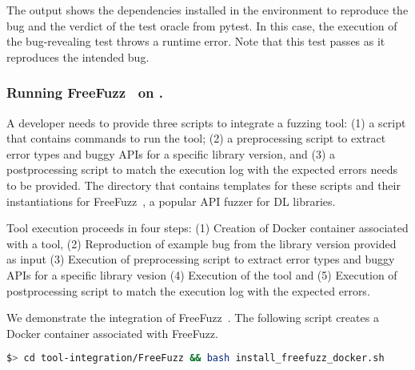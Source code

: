 \documentclass[sigconf,screen]{acmart}
\begin{document}
The output shows the dependencies installed in the environment to
reproduce the bug and the verdict of the test oracle from pytest. In
this case, the execution of the bug-revealing test throws a runtime
error. Note that this test passes as it reproduces the intended bug.



\subsubsection{Running FreeFuzz~\cite{wei2022free} on \tname.}\label{sec:running-free-fuzz}

A developer needs to provide three scripts to integrate a fuzzing
tool: (1) a script that contains commands to run the tool; (2) a
preprocessing script to extract error types and buggy APIs for a
specific library version, and (3) a postprocessing script to match the
execution log with the expected errors needs to be provided. The
directory  that contains templates for these
scripts and their instantiations for FreeFuzz~\cite{wei2022free}, a
popular API fuzzer for DL libraries.


Tool execution proceeds in four steps: (1) Creation of Docker
container associated with a tool, (2) Reproduction of example bug from
the library version provided as input (3) Execution of preprocessing
script to extract error types and buggy APIs for a specific library
vesion (4) Execution of the tool and (5) Execution of postprocessing
script to match the execution log with the expected errors.

We demonstrate the integration of FreeFuzz~\cite{wei2022free}. The
following script creates a Docker container associated with FreeFuzz.

\begin{lstlisting}[language=bash,basicstyle=\small,keywords={}]
$> cd tool-integration/FreeFuzz && bash install_freefuzz_docker.sh
\end{lstlisting}
\end{document}
